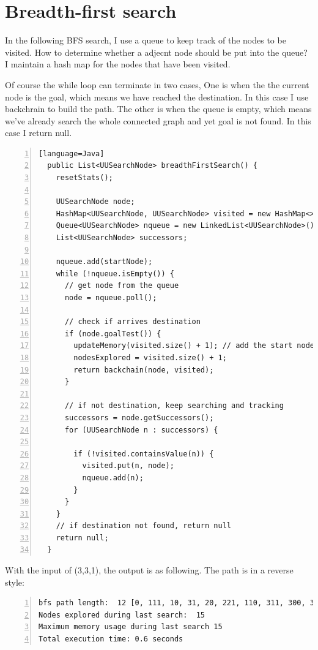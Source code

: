 \documentclass{article}
\begin{document}
\section{Breadth-first search}

In the following BFS search, I use a queue to keep track of the nodes to be visited. How to determine whether a adjecnt node should be put into the queue? I maintain a hash map for the nodes that have been visited.

Of course the while loop can terminate in two cases, One is when the the current node is the goal, which means we have reached the destination. In this case I use backchrain to build the path. The other is when the queue is empty, which means we've already search the whole connected graph and yet goal is not found. In this case I return null.

\begin{lstlisting}[numbers=left][language=Java]
  public List<UUSearchNode> breadthFirstSearch() {
    resetStats();

    UUSearchNode node;
    HashMap<UUSearchNode, UUSearchNode> visited = new HashMap<>();
    Queue<UUSearchNode> nqueue = new LinkedList<UUSearchNode>();
    List<UUSearchNode> successors;

    nqueue.add(startNode);
    while (!nqueue.isEmpty()) {
      // get node from the queue
      node = nqueue.poll();

      // check if arrives destination
      if (node.goalTest()) {
        updateMemory(visited.size() + 1); // add the start node
        nodesExplored = visited.size() + 1;
        return backchain(node, visited);
      }

      // if not destination, keep searching and tracking
      successors = node.getSuccessors();
      for (UUSearchNode n : successors) {

        if (!visited.containsValue(n)) {
          visited.put(n, node);
          nqueue.add(n);
        }
      }
    }
    // if destination not found, return null
    return null;
  }
\end{lstlisting}

With the input of (3,3,1), the output is as following. The path is in a reverse style:

\begin{lstlisting}[numbers=left]
bfs path length:  12 [0, 111, 10, 31, 20, 221, 110, 311, 300, 321, 220, 331]
Nodes explored during last search:  15
Maximum memory usage during last search 15
Total execution time: 0.6 seconds
\end{lstlisting}
\end{document}
